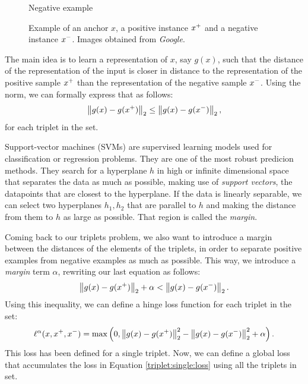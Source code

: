 \begin{nexample}
\begin{figure}[H]
          \caption*{Negative example}\label{fig:doggo}
        \endminipage
        \caption{Example of an anchor $x$, a positive instance $x^+$ and a negative instance $x^-$. Images obtained from \emph{Google}.}
        \end{figure}
    \end{nexample}
    


The main idea is to learn a representation of $x$, say $g(x)$, such that the distance of the representation of the input is closer in distance to the representation of the positive sample $x^+$ than the representation of the negative sample $x^-$. Using the norm\footnotemark, we can formally express that as follows: 
$$
\left\lVert g(x) - g(x^+)\right\rVert_2 \leq \left\lVert g(x) - g(x^-)\right\rVert_2,
$$
for each triplet in the set.




Support-vector machines (SVMs) are supervised learning models used for classification or regression problems. They are one of the most robust predicion methods. They search for a hyperplane $h$ in high or infinite dimensional space that separates the data as much as possible, making use of \emph{support vectors}, the datapoints that are closest to the hyperplane. If the data is linearly separable, we can select two hyperplanes $h_1,h_2$ that are parallel to $h$ and making the distance from them to $h$ as large as possible. That region is called the \emph{margin}.

Coming back to our triplets problem, we also want to introduce a margin between the distances of the elements of the triplets, in order to separate positive examples from negative examples as much as possible. This way, we introduce a \emph{margin} term $\alpha$, rewriting our last equation as follows:
\[
\left\lVert g(x) - g(x^+)\right\rVert_2 + \alpha < \left\lVert g(x) - g(x^-)\right\rVert_2.
\]
Using this inequality, we can define a hinge loss function for each triplet in the set:
\begin{equation}\label{triplet:single:loss}
\ell^\alpha (x,x^+,x^-) = \max \left(0, \left\lVert g(x) - g(x^+)\right\rVert_2^2 - \left\lVert g(x) - g(x^-)\right\rVert_2^2 + \alpha\right).
\end{equation}
This loss has been defined for a single triplet. Now, we can define a global loss that accumulates the loss in Equation \eqref{triplet:single:loss} using all the triplets in set.

